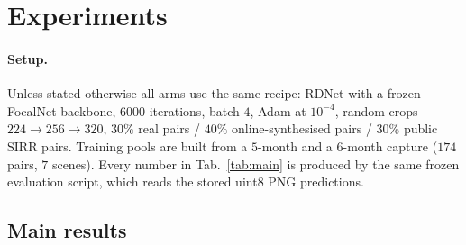 \section{Experiments}
\label{sec:experiments}

\paragraph{Setup.}
Unless stated otherwise all arms use the same recipe: RDNet with a frozen FocalNet backbone,
$6000$ iterations, batch $4$, Adam at $10^{-4}$, random crops $224\!\rightarrow\!256\! \rightarrow\!320$,
$30\%$ real pairs / $40\%$ online-synthesised pairs / $30\%$ public SIRR pairs. Training pools are
built from a $5$-month and a $6$-month capture ($174$ pairs, $7$ scenes). Every number in
Tab.~\ref{tab:main} is produced by the same frozen evaluation script, which reads the stored
uint8 PNG predictions.

\subsection{Main results}

